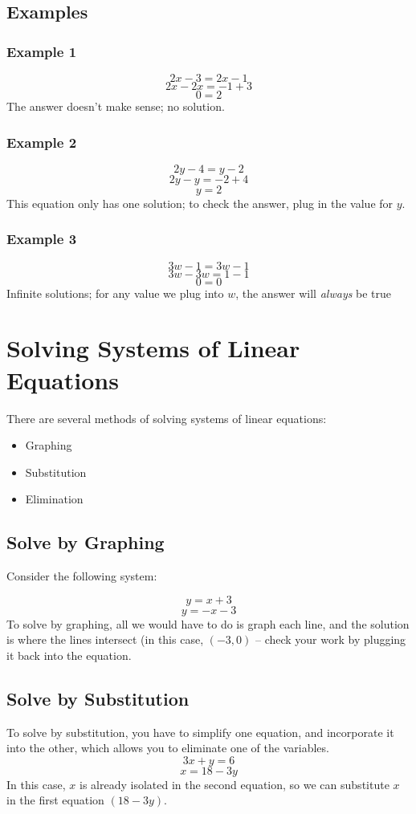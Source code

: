 \documentclass{article}
\begin{document}
\subsection{Examples}
\subsubsection{Example 1}
$$ 2x - 3 = 2x - 1$$
$$2x - 2x = -1 + 3$$
$$0 = 2$$
The answer doesn't make sense; no solution.
\subsubsection{Example 2}
$$2y - 4 = y - 2$$
$$2y - y = -2 + 4$$
$$y = 2$$
This equation only has one solution; to check the answer, plug in the value for $y$.
\subsubsection{Example 3}
$$3w - 1 = 3w - 1$$
$$3w - 3w = 1 - 1$$
$$ 0 = 0$$
Infinite solutions; for any value we plug into $w$, the answer will \textit{always} be true

\section{Solving Systems of Linear Equations}
There are several methods of solving systems of linear equations: 
\begin{itemize}
	\item Graphing
	\item Substitution
	\item Elimination
\end{itemize}
\subsection{Solve by Graphing}
Consider the following system: 

$$y = x + 3$$
$$y = -x - 3$$
To solve by graphing, all we would have to do is graph each line, and the solution is where the lines intersect (in this case, $(-3,0)$ -- check your work by plugging it back into the equation.
\subsection{Solve by Substitution}
To solve by substitution, you have to simplify one equation, and incorporate it into the other, which allows you to eliminate one of the variables.
$$3x + y = 6$$
$$x = 18 - 3y$$
In this case, $x$ is already isolated in the second equation, so we can substitute $x$ in the first equation $(18-3y)$.
\end{document}

